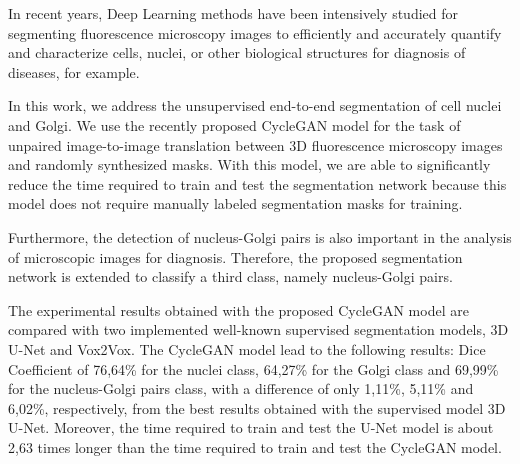 \acresetall
\noindent In recent years, Deep Learning methods have been intensively studied for segmenting fluorescence microscopy images to efficiently and accurately quantify and characterize cells, nuclei, or other biological structures for diagnosis of diseases, for example. 

In this work, we address the unsupervised end-to-end segmentation of cell nuclei and Golgi. We use the recently proposed CycleGAN model for the task of unpaired image-to-image translation between \ac{3D} fluorescence microscopy images and randomly synthesized masks. With this model, we are able to significantly reduce the time required to train and test the segmentation network because this model does not require manually labeled segmentation masks for training. 

Furthermore, the detection of nucleus-Golgi pairs is also important in the analysis of microscopic images for diagnosis. Therefore, the proposed segmentation network is extended to classify a third class, namely nucleus-Golgi pairs. 

The experimental results obtained with the proposed CycleGAN model are compared with two implemented well-known supervised segmentation models, \ac{3D} U-Net and Vox2Vox. The CycleGAN model lead to the following results: Dice Coefficient of 76,64\% for the nuclei class, 64,27\% for the Golgi class and 69,99\% for the nucleus-Golgi pairs class, with a difference of only 1,11\%, 5,11\% and 6,02\%, respectively, from the best results obtained with the supervised model \ac{3D} U-Net. Moreover, the time required to train and test the U-Net model is about 2,63 times longer than the time required to train and test the CycleGAN model.
